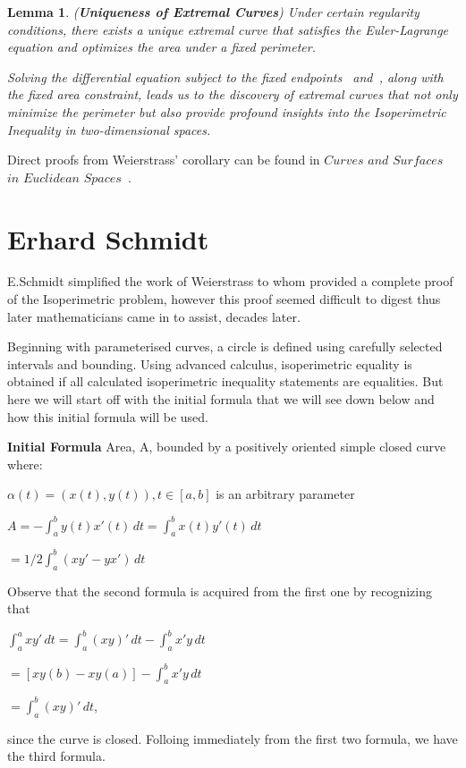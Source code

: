 \documentclass[a4paper]{book}
\newtheorem{lemma}[theorem]{Lemma}%
\numberwithin{theorem}{section}%
\begin{document}
    \begin{lemma}(\textbf{Uniqueness of Extremal Curves})
        Under certain regularity conditions, there exists a unique extremal curve that satisfies the Euler-Lagrange equation and optimizes the area under a fixed perimeter.

        Solving the differential equation subject to the fixed endpoints~\citep{goldstein1980classical} and~\citep{hilbert1985methods}, along with the fixed area constraint, leads us to the discovery of extremal curves that not only minimize the perimeter but also provide profound insights into the Isoperimetric Inequality in two-dimensional spaces.
    \end{lemma}
Direct proofs from Weierstrass' corollary can be found in $Curves$ $and$ $Surfaces$ $in$ $Euclidean$ $Spaces$~\citep{chern1966curves}.

\section{Erhard Schmidt}
E.Schmidt simplified the work of Weierstrass to whom provided a complete proof of the Isoperimetric problem, however this proof seemed difficult to digest thus later mathematicians came in to assist, decades later. 

Beginning with parameterised curves, a circle is defined using carefully selected intervals and bounding. Using advanced calculus, isoperimetric equality is obtained if all calculated isoperimetric inequality statements are equalities. But here we will start off with the initial formula that we will see down below and how this initial formula will be used.

\textbf{Initial Formula}
Area, A, bounded by a positively oriented simple closed curve where: 
\begin{center}
	$\displaystyle \alpha(t)=(x(t),y(t)), t\in [a,b]$ is an arbitrary parameter
\end{center}
\begin{center}
	$\displaystyle A=-\int_{a}^{b}y(t)x'(t)\,dt=\int_{a}^{b}x(t)y'(t)\,dt$

    $\displaystyle =1/2\int_{a}^{b}(xy'-yx')\,dt$
\end{center}
Observe that the second formula is acquired from the first one by recognizing that
\begin{center}
    $\displaystyle \int_{a}^{a}xy'\,dt=\int_{a}^{b}(xy)'\,dt-\int_{a}^{b}x'y\,dt$

    $\displaystyle =[xy(b)-xy(a)]-\int_{a}^{b}x'y\,dt$

    $\displaystyle = \int_{a}^{b}(xy)'\,dt$,
\end{center}
since the curve is closed. Folloing immediately from the first two formula, we have the third formula. 
\end{document}
